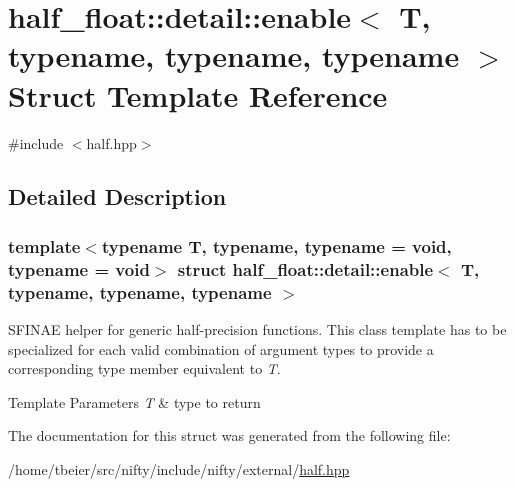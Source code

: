 \hypertarget{structhalf__float_1_1detail_1_1enable}{}\section{half\+\_\+float\+:\+:detail\+:\+:enable$<$ T, typename, typename, typename $>$ Struct Template Reference}
\label{structhalf__float_1_1detail_1_1enable}


{\ttfamily \#include $<$half.\+hpp$>$}



\subsection{Detailed Description}
\subsubsection*{template$<$typename T, typename, typename = void, typename = void$>$\newline
struct half\+\_\+float\+::detail\+::enable$<$ T, typename, typename, typename $>$}

S\+F\+I\+N\+AE helper for generic half-\/precision functions. This class template has to be specialized for each valid combination of argument types to provide a corresponding {\ttfamily type} member equivalent to {\itshape T}. 
\begin{DoxyTemplParams}{Template Parameters}
{\em T} & type to return \\
\hline
\end{DoxyTemplParams}


The documentation for this struct was generated from the following file\+:\begin{DoxyCompactItemize}
\item 
/home/tbeier/src/nifty/include/nifty/external/\hyperlink{half_8hpp}{half.\+hpp}\end{DoxyCompactItemize}
